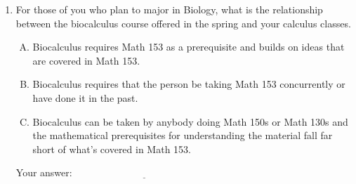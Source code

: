 \documentclass[10pt]{amsart}
\begin{document}
\begin{enumerate}
\item For those of you who plan to major in Biology, what is the
  relationship between the biocalculus course offered in the spring
  and your calculus classes.

  \begin{enumerate}[(A)]
  \item Biocalculus requires Math 153 as a prerequisite and builds on
    ideas that are covered in Math 153.
  \item Biocalculus requires that the person be taking Math 153
    concurrently or have done it in the past.
  \item Biocalculus can be taken by anybody doing Math 150s or Math
    130s and the mathematical prerequisites for understanding the
    material fall far short of what's covered in Math 153.
  \end{enumerate}

  \vspace{0.1in}
  Your answer: $\underline{\qquad\qquad\qquad\qquad\qquad\qquad\qquad}$
  \vspace{0.1in}

\end{enumerate}
\end{document}
